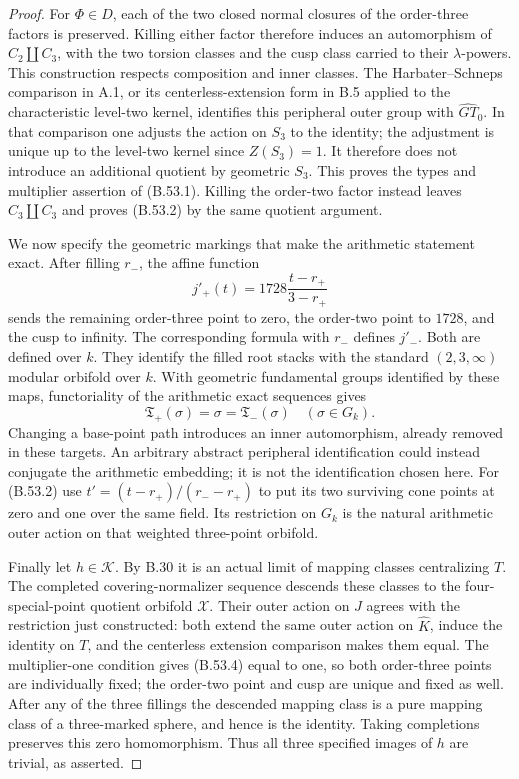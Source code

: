 \begin{proof}
For $\Phi\in D$, each of the two closed normal closures of
the order-three factors is preserved. Killing either factor
therefore induces an automorphism of $C_2\amalg C_3$,
with the two torsion classes and the cusp class carried to
their $\lambda$-powers. This construction respects composition
and inner classes. The Harbater--Schneps comparison in A.1,
or its centerless-extension form in B.5 applied to the
characteristic level-two kernel, identifies this peripheral
outer group with $\widehat{GT}_0$. In that comparison one
adjusts the action on $S_3$ to the identity; the adjustment
is unique up to the level-two kernel since $Z(S_3)=1$.
It therefore does not introduce an additional quotient by
geometric $S_3$. This proves the types and multiplier assertion
of (B.53.1). Killing the order-two factor instead leaves
$C_3\amalg C_3$ and proves (B.53.2) by the same quotient argument.

We now specify the geometric markings that make the arithmetic
statement exact. After filling $r_-$, the affine function
\[
                j'_+(t)=1728\frac{t-r_+}{3-r_+}
\]
sends the remaining order-three point to zero, the order-two
point to $1728$, and the cusp to infinity. The corresponding
formula with $r_-$ defines $j'_-$. Both are defined over $k$.
They identify the filled root stacks with the standard
$(2,3,\infty)$ modular orbifold over $k$. With geometric
fundamental groups identified by these maps, functoriality
of the arithmetic exact sequences gives
\[
           \mathfrak T_+(\sigma)=\sigma
                =\mathfrak T_-(\sigma)\quad(\sigma\in G_k).
                                                               \tag{B.53.5}
\]
Changing a base-point path introduces an inner automorphism,
already removed in these targets. An arbitrary abstract
peripheral identification could instead conjugate the
arithmetic embedding; it is not the identification chosen
here. For (B.53.2) use
$t'=(t-r_+)/(r_--r_+)$ to put its two surviving cone points
at zero and one over the same field. Its restriction on
$G_k$ is the natural arithmetic outer action on that
weighted three-point orbifold.

Finally let $h\in\mathcal K$. By B.30 it is an actual
limit of mapping classes centralizing $T$. The completed
covering-normalizer sequence descends these classes to the
four-special-point quotient orbifold $\mathscr X$.
Their outer action on $J$ agrees with the restriction just
constructed: both extend the same outer action on
$\widehat K$, induce the identity on $T$, and the
centerless extension comparison makes them equal.
The multiplier-one condition gives (B.53.4) equal to one,
so both order-three points are individually fixed; the
order-two point and cusp are unique and fixed as well.
After any of the three fillings the descended mapping
class is a pure mapping class of a three-marked sphere,
and hence is the identity. Taking completions preserves
this zero homomorphism. Thus all three specified images
of $h$ are trivial, as asserted.
\end{proof}

